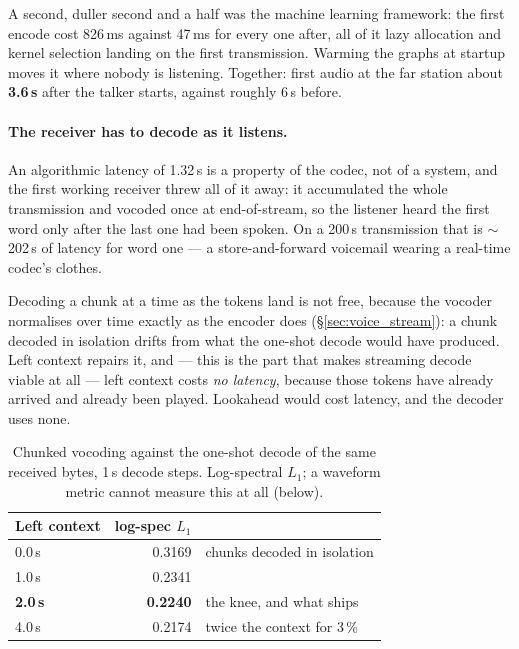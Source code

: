 A second, duller second and a half was the machine learning framework:
the first encode cost 826\,ms against 47\,ms for every one after, all of
it lazy allocation and kernel selection landing on the first
transmission.  Warming the graphs at startup moves it where nobody is
listening.  Together: first audio at the far station about
\textbf{3.6\,s} after the talker starts, against roughly 6\,s before.

\paragraph{The receiver has to decode as it listens.}
An algorithmic latency of 1.32\,s is a property of the codec, not of a
system, and the first working receiver threw all of it away: it
accumulated the whole transmission and vocoded once at end-of-stream,
so the listener heard the first word only after the last one had been
spoken.  On a 200\,s transmission that is $\sim$202\,s of latency for
word one --- a store-and-forward voicemail wearing a real-time
codec's clothes.

Decoding a chunk at a time as the tokens land is not free, because the
vocoder normalises over time exactly as the encoder does
(\S\ref{sec:voice_stream}): a chunk decoded in isolation drifts from
what the one-shot decode would have produced.  Left context repairs it,
and --- this is the part that makes streaming decode viable at all ---
left context costs \emph{no latency}, because those tokens have already
arrived and already been played.  Lookahead would cost latency, and the
decoder uses none.

\begin{table}[H]
    \centering
    \caption{Chunked vocoding against the one-shot decode of the same
             received bytes, 1\,s decode steps.  Log-spectral $L_1$; a
             waveform metric cannot measure this at all (below).}
    \label{tab:voice_decctx}
    \small
    \begin{tabular}{@{}lrl@{}}
    \toprule
    \textbf{Left context} & \textbf{log-spec $L_1$} & \\
    \midrule
    0.0\,s & 0.3169 & chunks decoded in isolation \\
    1.0\,s & 0.2341 & \\
    \textbf{2.0\,s} & \textbf{0.2240} & the knee, and what ships \\
    4.0\,s & 0.2174 & twice the context for 3\,\% \\
    \bottomrule
    \end{tabular}
\end{table}

